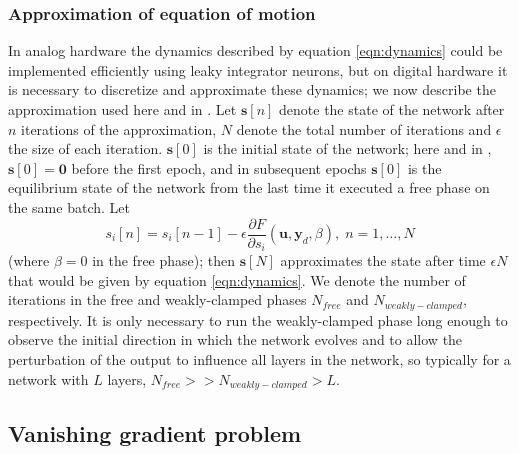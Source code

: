 \documentclass[format=sigconf]{acmart}
\newcommand{\mtx}[1]{\bm{#1}}
\begin{document}
\subsubsection{Approximation of equation of motion}

In analog hardware the dynamics described by equation \ref{eqn:dynamics} could be implemented efficiently using leaky integrator neurons, but on digital hardware it is necessary to discretize and approximate these dynamics; we now describe the approximation used here and in \cite{scellier17}. Let $\mtx{s}[n]$ denote the state of the network after $n$ iterations of the approximation, $N$ denote the total number of iterations and $\epsilon$ the size of each iteration. $\mtx{s}[0]$ is the initial state of the network; here and in \cite{scellier17}, $\mtx{s}[0]=\mtx{0}$ before the first epoch, and in subsequent epochs $\mtx{s}[0]$ is the equilibrium state of the network from the last time it executed a free phase on the same batch. Let 
 \begin{equation}
 s_i[n]=s_i[n-1]-\epsilon \frac{\partial F}{\partial s_i}(\mtx{u},\mtx{y}_d,\beta),\;n=1,\hdots,N
 \end{equation}
(where $\beta=0$ in the free phase); then $\mtx{s}[N]$ approximates the state after time $\epsilon N$ that would be given by equation \ref{eqn:dynamics}.
 We denote the number of iterations in the free and weakly-clamped phases $N_{free}$ and $N_{weakly-clamped}$, respectively. It is only necessary to run the weakly-clamped phase long enough to observe the initial direction in which the network evolves and to allow the perturbation of the output to influence all layers in the network, so typically for a network with $L$ layers, $N_{free}>>N_{weakly-clamped}>L$.

\subsection{Vanishing gradient problem}
\label{sec:vangrad}
\end{document}
